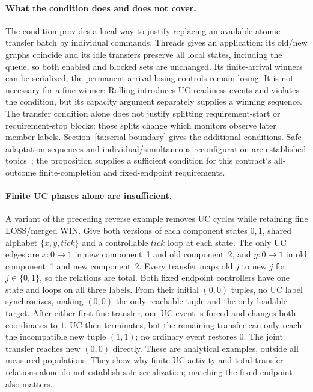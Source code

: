 \paragraph{What the condition does and does not cover.}
The condition provides a local way to justify replacing an available atomic transfer batch by individual commands. Threads gives an application: its old/new graphs coincide and its idle transfers preserve all local states, including the queue, so both enabled and blocked sets are unchanged. Its finite-arrival winners can be serialized; the permanent-arrival losing controls remain losing. It is not necessary for a fine winner: Rolling introduces UC readiness events and violates the condition, but its capacity argument separately supplies a winning sequence. The transfer condition alone does not justify splitting requirement-start or requirement-stop blocks: those splits change which monitors observe later member labels. Section~\ref{ta:serial-boundary} gives the additional conditions. Safe adaptation sequences and individual/simultaneous reconfiguration are established topics~\cite{BoyerGruberPous2013,ThuijsmanReniers2024DynamicFeature}; the proposition supplies a sufficient condition for this contract's all-outcome finite-completion and fixed-endpoint requirements.


\paragraph{Finite UC phases alone are insufficient.}
A variant of the preceding reverse example removes UC cycles while retaining fine LOSS/merged WIN. Give both versions of each component states $0,1$, shared alphabet $\{x,y,tick\}$ and a controllable $tick$ loop at each state. The only UC edges are $x:0\to1$ in new component~1 and old component~2, and $y:0\to1$ in old component~1 and new component~2. Every transfer maps old $j$ to new $j$ for $j\in\{0,1\}$, so the relations are total. Both fixed endpoint controllers have one state and loops on all three labels. From their initial $(0,0)$ tuples, no UC label synchronizes, making $(0,0)$ the only reachable tuple and the only loadable target. After either first fine transfer, one UC event is forced and changes both coordinates to $1$. UC then terminates, but the remaining transfer can only reach the incompatible new tuple $(1,1)$; no ordinary event restores $0$. The joint transfer reaches new $(0,0)$ directly. These are analytical examples, outside all measured populations. They show why finite UC activity and total transfer relations alone do not establish safe serialization; matching the fixed endpoint also matters.



